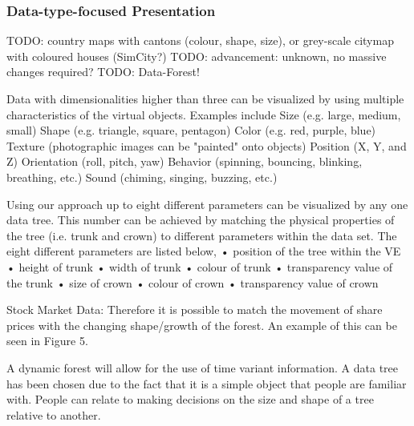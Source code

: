 \subsubsection{Data-type-focused Presentation}

TODO: country maps with cantons (colour, shape, size), or grey-scale citymap with coloured houses (SimCity?)
TODO: advancement: unknown, no massive changes required?
TODO: Data-Forest!


Data with dimensionalities higher than three can be visualized by using multiple characteristics of the virtual objects. Examples include
Size (e.g. large, medium, small)
Shape (e.g. triangle, square, pentagon)
Color (e.g. red, purple, blue)
Texture (photographic images can be "painted" onto objects)
Position (X, Y, and Z)
Orientation (roll, pitch, yaw)
Behavior (spinning, bouncing, blinking, breathing, etc.)
Sound (chiming, singing, buzzing, etc.)
\cite{Stone1994}

Using our approach up to eight different parameters can be visualized by any one data tree. This number can be achieved by matching the physical properties of the tree (i.e. trunk and crown) to different parameters within the data set. The eight different parameters are listed below,
• position of the tree within the VE • height of trunk • width of trunk • colour of trunk • transparency value of the trunk • size of crown • colour of crown • transparency value of crown
\cite{Jamieson2007}

Stock Market Data: Therefore it is possible to match the movement of share prices with the changing shape/growth of the forest. An example of this can be seen in Figure 5.
\cite{Jamieson2007}

A dynamic forest will allow for the use of time variant information. A data tree has been chosen due to the fact that it is a simple object that people are familiar with. People can relate to making decisions on the size and shape of a tree relative to another.
\cite{Jamieson2007}

